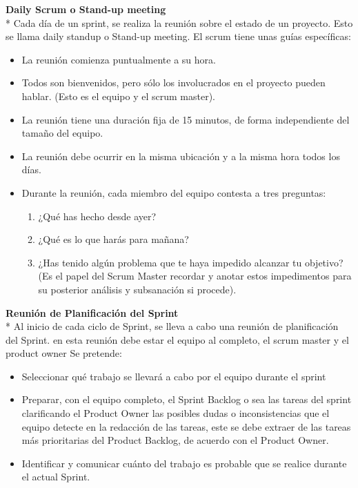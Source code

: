 \documentclass[../pfc.tex]{subfiles}
\begin{document}
	\textbf{Daily Scrum o Stand-up meeting}\\*
	Cada día de un sprint, se realiza la reunión sobre el estado de un proyecto. Esto se llama daily standup o Stand-up meeting. El scrum tiene unas guías específicas:
	\begin{itemize} 
		\item La reunión comienza puntualmente a su hora. 
		\item Todos son bienvenidos, pero sólo los involucrados en el proyecto pueden hablar. (Esto es el equipo y el scrum master). 
		\item La reunión tiene una duración fija de 15 minutos, de forma independiente del tamaño del equipo.
		\item La reunión debe ocurrir en la misma ubicación y a la misma hora todos los días.
		\item Durante la reunión, cada miembro del equipo contesta a tres preguntas:
		\begin{enumerate}
			\item ¿Qué has hecho desde ayer?
			\item ¿Qué es lo que harás para mañana?
			\item ¿Has tenido algún problema que te haya impedido alcanzar tu objetivo? (Es el papel del Scrum Master recordar y anotar estos impedimentos para su posterior análisis y subsanación si procede).
		\end{enumerate} 
	\end{itemize}
	
	\textbf{Reunión de Planificación del Sprint }\\*
	Al inicio de cada ciclo de Sprint, se lleva a cabo una reunión de planificación del Sprint. en esta reunión debe estar el equipo al completo, el scrum master y el product owner Se pretende:
	\begin{itemize} 
		\item Seleccionar qué trabajo se llevará a cabo por el equipo durante el sprint 
		\item Preparar, con el equipo completo, el Sprint Backlog o sea las tareas del sprint clarificando el Product Owner las posibles dudas o  inconsistencias que el equipo detecte en la redacción de las tareas, este se debe extraer de las tareas más prioritarias del Product Backlog, de acuerdo con el Product Owner. 
		\item Identificar y comunicar cuánto del trabajo es probable que se realice durante el actual Sprint.
	\end{itemize}
	
\end{document}
